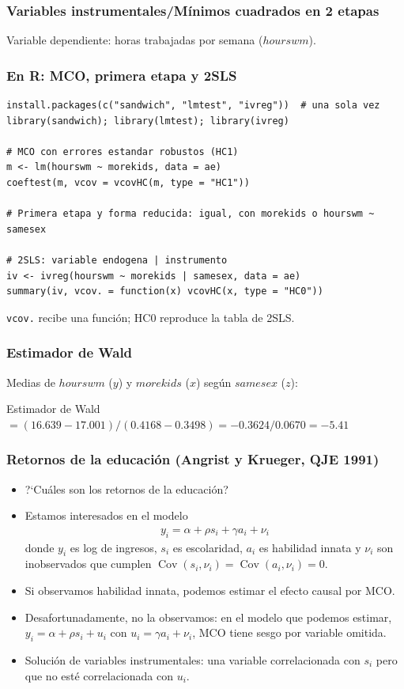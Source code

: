 \documentclass[t, compress, spanish, aspectratio=169]{beamer}
\DeclareMathOperator{\Cov}{Cov}
\begin{document}
\begin{frame}
	\frametitle{Variables instrumentales/M\'inimos cuadrados en 2 etapas}
	Variable dependiente: horas trabajadas por semana ($hourswm$).
	\begin{center}
	\footnotesize\renewcommand{\arraystretch}{0.9}
	
	\end{center}
\end{frame}
\begin{frame}[fragile]
	\frametitle{En R: MCO, primera etapa y 2SLS}
\footnotesize
\begin{verbatim}
install.packages(c("sandwich", "lmtest", "ivreg"))  # una sola vez
library(sandwich); library(lmtest); library(ivreg)

# MCO con errores estandar robustos (HC1)
m <- lm(hourswm ~ morekids, data = ae)
coeftest(m, vcov = vcovHC(m, type = "HC1"))

# Primera etapa y forma reducida: igual, con morekids o hourswm ~ samesex

# 2SLS: variable endogena | instrumento
iv <- ivreg(hourswm ~ morekids | samesex, data = ae)
summary(iv, vcov. = function(x) vcovHC(x, type = "HC0"))
\end{verbatim}
\small
\texttt{vcov.} recibe una funci\'on; HC0 reproduce la tabla de 2SLS.
\end{frame}
\begin{frame}
	\frametitle{Estimador de Wald}
	Medias de $hourswm$ ($y$) y $morekids$ ($x$) seg\'un $samesex$ ($z$):
	\begin{center}
	\small
	
	\end{center}
	\small
	Estimador de Wald $=(16.639-17.001)/(0.4168-0.3498)=-0.3624/0.0670=-5.41$
\end{frame}
	\begin{frame}
		\frametitle{Retornos de la educaci\'on (Angrist y Krueger, QJE 1991)}
		\begin{itemize}
			\item  ?`Cu\'ales son los retornos de la educaci\'on?
			\item Estamos interesados en el modelo
			\begin{align*}
				y_i=\alpha+\rho s_i+\gamma a_i+\nu_i
			\end{align*}
			donde $y_i$ es log de ingresos, $s_i$ es escolaridad, $a_i$ es habilidad innata y $\nu_i$ son inobservados que cumplen $\Cov(s_i,\nu_i)=\Cov(a_i,\nu_i)=0$.
			\item Si observamos habilidad innata, podemos estimar el efecto causal por MCO.
			\item Desafortunadamente, no la observamos: en el modelo que podemos estimar, $y_i=\alpha+\rho s_i+u_i$ con $u_i=\gamma a_i+\nu_i$, MCO tiene sesgo por variable omitida.
			\item  Soluci\'on de variables instrumentales: una variable correlacionada con $s_i$ pero que no est\'e correlacionada con $u_i$.
		\end{itemize}
	\end{frame}
\end{document}
